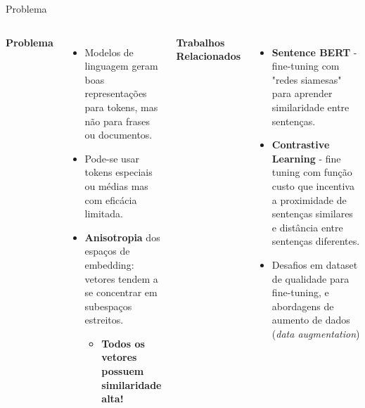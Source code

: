 \documentclass{beamer}
\begin{document}
\begin{frame}{Problema}

	\begin{columns}[t]
		\vspace{-5mm}

    \begin{center}
    \textbf{Problema}
    \end{center}

    \small
    \begin{itemize}
      \item Modelos de linguagem geram boas representações para tokens, mas não para frases ou documentos.
      \item Pode-se usar tokens especiais ou médias mas com eficácia limitada.
      \item \textbf{Anisotropia} dos espaços de embedding: vetores tendem a se concentrar em subespaços estreitos.

        \begin{itemize}
          \item \textbf{Todos os vetores possuem similaridade alta!}
        \end{itemize}

    \end{itemize}

		\vspace{-5mm}

    \begin{center}
    \textbf{Trabalhos Relacionados}
    \end{center}

    \small
    \begin{itemize}
      \item \textbf{Sentence BERT}\cite{reimers2019sentencebertsentenceembeddingsusing} - fine-tuning com "redes siamesas" para aprender similaridade entre sentenças.
      \item \textbf{Contrastive Learning} - fine tuning com função custo que incentiva a proximidade de sentenças similares e distância entre sentenças diferentes.
      \item Desafios em dataset de qualidade para fine-tuning, e abordagens de aumento de dados (\emph{data augmentation})
    \end{itemize}

	\end{columns}
\end{frame}
\end{document}
